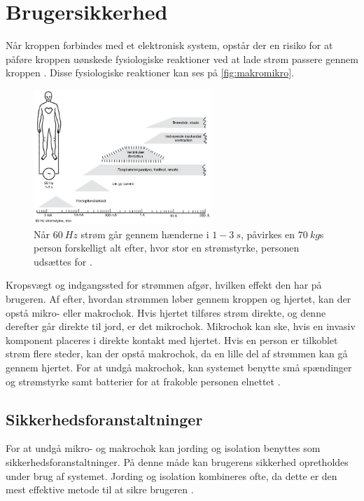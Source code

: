 \chapter{Brugersikkerhed} \label{sec:brugersikkerhed}
Når kroppen forbindes med et elektronisk system, opstår der en risiko for at påføre kroppen uønskede fysiologiske reaktioner ved at lade strøm passere gennem kroppen \citep{webster1998}. Disse fysiologiske reaktioner kan ses på \autoref{fig:makromikro}. 

\begin{figure}[H]
\centering
\includegraphics[width=0.6\textwidth]{figures/makromikro}
\caption{Når $60~Hz$ strøm går gennem hænderne i $1-3~s$, påvirkes en $70~kg$s person forskelligt alt efter, hvor stor en strømstyrke, personen udsættes for \citep{webster1998}.}
\label{fig:makromikro}
\end{figure}

\noindent
Kropsvægt og indgangssted for strømmen afgør, hvilken effekt den har på brugeren. Af efter, hvordan strømmen løber gennem kroppen og hjertet, kan der opstå mikro- eller makrochok. Hvis hjertet tilføres strøm direkte, og denne derefter går direkte til jord, er det mikrochok. Mikrochok kan ske, hvis en invasiv komponent placeres i direkte kontakt med hjertet. Hvis en person er tilkoblet strøm flere steder, kan der opstå makrochok, da en lille del af strømmen kan gå gennem hjertet. For at undgå makrochok, kan systemet benytte små spændinger og strømstyrke samt batterier for at frakoble personen elnettet \citep{webster1998}.

\section{Sikkerhedsforanstaltninger}
For at undgå mikro- og makrochok kan jording og isolation benyttes som sikkerhedsforanstaltninger. På denne måde kan brugerens sikkerhed opretholdes under brug af systemet. Jording og isolation kombineres ofte, da dette er den mest effektive metode til at sikre brugeren \citep{webster1998}.


